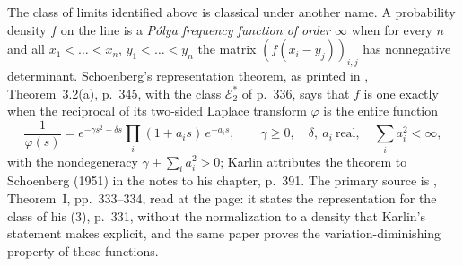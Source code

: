 \begin{remark}
\label{rem:polya-limits}
The class of limits identified above is classical under another name. A probability density $f$
on the line is a \emph{P\'olya frequency function of order $\infty$} when for every $n$ and all
$x_1 < \dots < x_n$, $y_1 < \dots < y_n$ the matrix $(f(x_i - y_j))_{i,j}$ has nonnegative
determinant. Schoenberg's representation theorem, as printed in ,
Theorem~3.2(a), p.~345, with the class $\mathcal{E}_2^{*}$ of p.~336, says that $f$ is one
exactly when the reciprocal of its two-sided Laplace transform $\varphi$ is the entire function
\begin{equation}\label{eq:schoenberg-e2}
  \frac{1}{\varphi(s)} = e^{-\gamma s^2 + \delta s}\prod_i (1 + a_is)\,e^{-a_is},
  \qquad \gamma \ge 0, \quad \delta,\ a_i \ \text{real}, \quad \sum_i a_i^2 < \infty,
\end{equation}
with the nondegeneracy $\gamma + \sum_i a_i^2 > 0$; Karlin attributes the theorem to Schoenberg
(1951) in the notes to his chapter, p.~391. The primary source is , Theorem~I, pp.~333--334, read at the page: it
states the representation for the class of his (3), p.~331, without the normalization to a
density that Karlin's statement makes explicit, and the same paper proves the
variation-diminishing property of these functions.


\end{remark}
